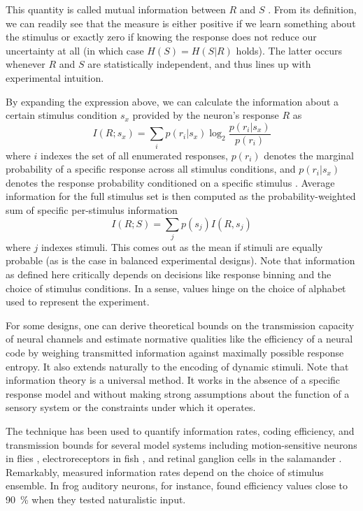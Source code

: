 This quantity is called mutual information between $R$ and $S$ \citep{Cover:2006aa}. From its definition, we can readily see that the measure is either positive if we learn something about the stimulus or exactly zero if knowing the response does not reduce our uncertainty at all (in which case $H(S) = H(S|R)$ holds). The latter occurs whenever $R$ and $S$ are statistically independent, and thus lines up with experimental intuition.

By expanding the expression above, we can calculate the information about a certain stimulus condition $s_x$ provided by the neuron's response $R$ as
\begin{equation}
    I(R; s_x) = \sum_{i} p(r_i | s_x) \log_2 \frac{p(r_i | s_x)}{p(r_i)}
\end{equation}
where $i$ indexes the set of all enumerated responses, $p(r_i)$ denotes the marginal probability of a specific response across all stimulus conditions, and $p(r_i | s_x)$ denotes the response probability conditioned on a specific stimulus \citep{Borst:1999hw}. Average information for the full stimulus set is then computed as the probability-weighted sum of specific per-stimulus information
\begin{equation}
    I(R; S) = \sum_{j} p(s_j) I(R, s_j)
\end{equation}
where $j$ indexes stimuli. This comes out as the mean if stimuli are equally probable (as is the case in balanced experimental designs). Note that information as defined here critically depends on decisions like response binning and the choice of stimulus conditions. In a sense, values hinge on the choice of alphabet used to represent the experiment.

For some designs, one can derive theoretical bounds on the transmission capacity of neural channels and estimate normative qualities like the efficiency of a neural code by weighing transmitted information against maximally possible response entropy. It also extends naturally to the encoding of dynamic stimuli. Note that information theory is a universal method. It works in the absence of a specific response model and without making strong assumptions about the function of a sensory system or the constraints under which it operates.

The technique has been used to quantify information rates, coding efficiency, and transmission bounds for several model systems including motion-sensitive neurons in flies \citep{Bialek:1991aa,vanSteveninck:1997aa,Haag:1998wr,Weber:2012dr}, electroreceptors in fish \citep{Wessel:1996aa}, and retinal ganglion cells in the salamander \citep{Warland:1997aa}. Remarkably, measured information rates depend on the choice of stimulus ensemble. In frog auditory neurons, for instance, \citet{Rieke:1995aa} found efficiency values close to \SI{90}{\percent} when they tested naturalistic input.

